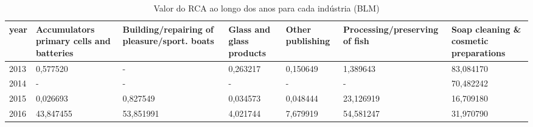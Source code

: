 \begin{table}
\centering
\caption{Valor do RCA ao longo dos anos para cada indústria (BLM)}
\begin{tabular}{p{1cm}p{2cm}p{2cm}p{2cm}p{2cm}p{2cm}p{2cm}}
\toprule
 year &  Accumulators primary cells and batteries &  Building/repairing of pleasure/sport. boats &  Glass and glass products &  Other publishing &  Processing/preserving of fish &  Soap cleaning \& cosmetic preparations \\
\midrule
 2013 &                                  0,577520 &                                            - &                  0,263217 &          0,150649 &                       1,389643 &                              83,084170 \\
 2014 &                                         - &                                            - &                         - &                 - &                              - &                              70,482242 \\
 2015 &                                  0,026693 &                                     0,827549 &                  0,034573 &          0,048444 &                      23,126919 &                              16,709180 \\
 2016 &                                 43,847455 &                                    53,851991 &                  4,021744 &          7,679919 &                      54,581247 &                              31,970790 \\
\bottomrule
\end{tabular}
\end{table}
